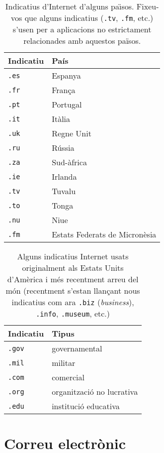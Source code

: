\begin{table}
\begin{center}
\begin{tabular}{l|l}
\hline\hline
{\sc Indicatiu} & {\sc País} \\\hline
{\tt .es} & Espanya \\
{\tt .fr} & França \\
{\tt .pt} & Portugal \\
{\tt .it} & Itàlia \\
{\tt .uk} & Regne Unit \\
{\tt .ru} & Rússia \\
{\tt .za} & Sud-àfrica \\
{\tt .ie} & Irlanda \\
{\tt .tv} & Tuvalu \\
{\tt .to} & Tonga \\
{\tt .nu} & Niue \\
{\tt .fm} & Estats Federats de Micronèsia \\
\hline
\end{tabular}
\end{center}
\caption{Indicatius d'Internet d'alguns pa\"{\i}sos. Fixeu-vos que
  alguns indicatius (\texttt{.tv}, \texttt{.fm}, etc.) s'usen per a
  aplicacions no estrictament relacionades amb aquestos països.}
\label{tb:pais}
\end{table}

\begin{table}
\begin{center}
\begin{tabular}{l|l}
\hline\hline
{\sc Indicatiu} & {\sc Tipus} \\\hline
{\tt .gov} & governamental \\
{\tt .mil} & militar \\
{\tt .com} & comercial \\
{\tt .org} & organització no lucrativa \\
{\tt .edu} & institució educativa \\
\hline\end{tabular}
\end{center}
\caption{Alguns indicatius Internet usats originalment als Estats
  Units d'Amèrica i més recentment arreu del
  món (recentment s'estan llançant nous indicatius com ara
  \texttt{.biz} (\emph{business}), \texttt{.info}, \texttt{.museum}, etc.)}
\label{tb:tipus}
\end{table}

\section{Correu electrònic}

